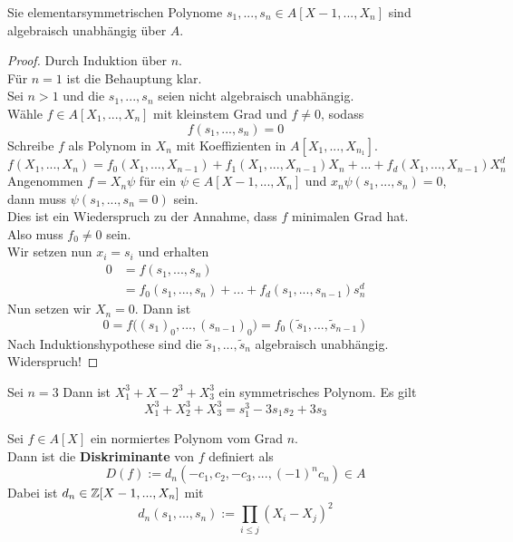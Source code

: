 	\begin{theorem}
		Sie elementarsymmetrischen Polynome $s_1,...,s_n\in A[X-1,...,X_n]$ sind algebraisch unabhängig über $A$.
	\end{theorem}
	\begin{proof}
		Durch Induktion über $n$.\\
		Für $n=1$ ist die Behauptung klar.\\
		Sei $n>1$ und die $s_1,...,s_n$ seien nicht algebraisch unabhängig.\\
		Wähle $f\in A[X_1,...,X_n]$ mit kleinstem Grad und $f\neq 0$, sodass
		\[f(s_1,...,s_n)=0\]
		Schreibe $f$ als Polynom in $X_n$ mit Koeffizienten in $A[X_1,...,X_{n_1}]$.\\
		\[f(X_1,...,X_n)=f_0(X_1,...,X_{n-1})+f_1(X_1,...,X_{n-1})X_n+...+f_d(X_1,...,X_{n-1})X_n^d\]
		Angenommen $f=X_n\psi$ für ein $\psi\in A[X-1,...,X_n]$ und $x_n\psi(s_1,...,s_n)=0$, dann muss $\psi(s_1,...,s_n=0)$ sein.\\
		Dies ist ein Wiederspruch zu der Annahme, dass $f$ minimalen Grad hat.\\
		Also muss $f_0\neq 0$ sein.\\
		Wir setzen nun $x_i=s_i$ und erhalten
		\begin{align*}
		0&=f(s_1,...,s_n)\\
		&=f_0(s_1,...,s_n)+...+f_d(s_1,...,s_{n-1})s_n^d
		\end{align*}
		Nun setzen wir $X_n=0$. Dann ist 
		\[0=f\big((s_1)_0,...,(s_{n-1})_0\big)=f_0(\tilde s_1,...,\tilde s_{n-1})\]
		Nach Induktionshypothese sind die $\tilde s_1,...,\tilde s_n$ algebraisch unabhängig. Widerspruch!
	\end{proof}

	
	\begin{exm}
		Sei $n=3$ Dann ist $X_1^3+X-2^3+X_3^3$ ein symmetrisches Polynom. Es gilt \[X_1^3+X_2^3+X_3^3=s_1^3-3s_1s_2+3s_3\]
	\end{exm}


	\begin{definition}
		Sei $f\in A[X]$ ein normiertes Polynom vom Grad $n$.\\
		Dann ist die \textbf{Diskriminante}  von $f$ definiert als
		\[D(f):=d_n(-c_1,c_2,-c_3,...,(-1)^nc_n)\in A\]
		Dabei ist $d_n\in\mathbb{Z}[X-1,...,X_n]$ mit
		\[d_n(s_1,...,s_n):=\prod_{i\leq j}(X_i-X_j)^2\]
	\end{definition}

